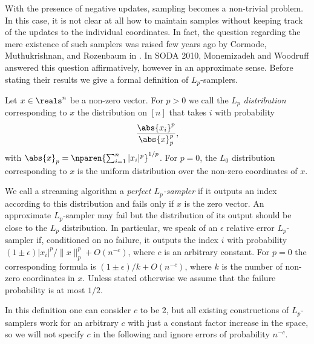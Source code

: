 With the presence of negative updates, sampling becomes a
non-trivial problem. In this case, it is not clear at all how to
maintain samples without keeping track of the updates to the
individual coordinates. In fact, the question regarding the mere
existence of such samplers was raised few years ago by Cormode,
Muthukrishnan, and Rozenbaum in \cite{CormodeMR2005}. In SODA
2010, Monemizadeh and Woodruff \cite{MonemizadehW2010} answered
this question affirmatively, however in an approximate sense.
Before stating their results we give a formal definition of
$L_p$-samplers.

\begin{definition}
Let $x \in \reals^n$ be a non-zero vector. For $p>0$ we call
the {\em $L_p$ distribution} corresponding to $x$ the
distribution on $[n]$ that takes $i$ with probability
\begin{align*}
  \frac{\abs{x_i}^p}{\abs{x}_p^p},
\end{align*}
with $\abs{x}_p=\nparen{\sum_{i=1}^n|x_i|^p}^{1/p}$. For $p=0$, 
the $L_0$ distribution corresponding to $x$ is the uniform 
distribution over the non-zero coordinates of $x$.
\end{definition}

We call a streaming algorithm a {\em perfect $L_p$-sampler} if
it outputs an index according to this distribution and fails
only if $x$ is the zero vector. An approximate $L_p$-sampler may
fail but the distribution of its output should be close to the
$L_p$ distribution. In particular, we speak of an $\epsilon$
relative error $L_p$-sampler if, conditioned on no failure, it
outputs the index $i$ with probability
$(1\pm\epsilon)|x_i|^p/\|x\|_p^p+O(n^{-c})$, where $c$ is an
arbitrary constant. For $p=0$ the corresponding formula is
$(1\pm\epsilon)/k+O(n^{-c})$, where $k$ is the number of
non-zero coordinates in $x$. Unless stated otherwise we assume
that the failure probability is at most $1/2$.

In this definition one can consider $c$ to be 2, but all
existing constructions of $L_p$-samplers work for an arbitrary
$c$ with just a constant factor increase in the space, so we
will not specify $c$ in the following and ignore errors of
probability $n^{-c}$.
 

